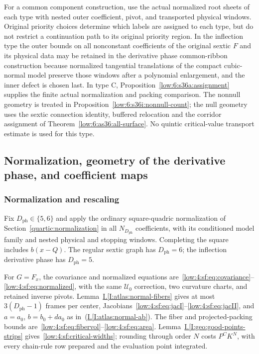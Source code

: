 \documentclass[11pt]{amsart}
\theoremstyle{definition}
\theoremstyle{remark}
\numberwithin{equation}{section}
\newcommand{\partIref}[1]{\hyperref[I:#1]{I.\ref*{I:#1}}}
\newcommand{\partIeqref}[1]{\textup{(\partIref{#1})}}
\begin{document}
For a common component construction, use the actual normalized root sheets of each type with nested outer coefficient, pivot, and transported physical windows. Original priority choices determine which labels are assigned to each type, but do not restrict a continuation path to its original priority region. In the inflection type the outer bounds on all nonconstant coefficients of the original sextic $F$ and its physical data may be retained in the derivative phase common-ribbon construction because normalized tangential translations of the compact cubic-normal model preserve those windows after a polynomial enlargement, and the inner defect is chosen last. In type C, Proposition~\ref{low:6:s36a:assignment} supplies the finite actual normalization and packing comparison. The nonnull geometry is treated in Proposition~\ref{low:6:s36i:nonnull-count}; the null geometry uses the sextic connection identity, buffered relocation and the corridor assignment of Theorem~\ref{low:6:as36:all-surface}. No quintic critical-value transport estimate is used for this type.


\subsection{Normalization, geometry of the derivative phase, and coefficient maps}\label{low:6:inflection-geometry}\label{low:6:qsf:normalization}\label{low:6:qsf:sec:packing}\label{low:6:qsf:preparation}\label{low:6:qsf:sec:gauss}\label{low:6:qsf:null-incidence-section}\label{low:6:s36q:module}\label{low:6:sai:section}\label{low:6:inflection-atlas}\label{low:6:nc36:section}

\subsubsection{Normalization and rescaling}
Fix $D_{\mathrm{ph}}\in\{5,6\}$ and apply the ordinary square-quadric normalization of Section~\ref{quartic:normalization} in all $N_{D_{\mathrm{ph}}}$ coefficients, with its conditioned model family and nested physical and stopping windows. Completing the square includes $b(x-Q)$. The regular sextic graph has $D_{\mathrm{ph}}=6$; the inflection derivative phase has $D_{\mathrm{ph}}=5$.

For $G=F_x$, the covariance and normalized equations are~\eqref{low:4:sf:eq:covariance}--\eqref{low:4:sf:eq:normalized}, with the same $\mathcal U_0$ correction, two curvature charts, and retained inverse pivots. Lemma~\partIref{atlas:normal-fibers} gives at most $3(D_{\mathrm{ph}}-1)$ frames per center, Jacobians~\eqref{low:4:sf:eq:jacI}--\eqref{low:4:sf:eq:jacII}, and $a=a_0$, $b=b_0+da_0$ as in~\partIeqref{atlas:normal-ab}. The fiber and projected-packing bounds are~\eqref{low:4:sf:eq:fibervol}--\eqref{low:4:sf:eq:area}. Lemma~\partIref{geo:good-points-strips} gives~\eqref{low:4:sf:critical-widths}; rounding through order $N$ costs $P^CK^N$, with every chain-rule row prepared and the evaluation point integrated.
\end{document}
